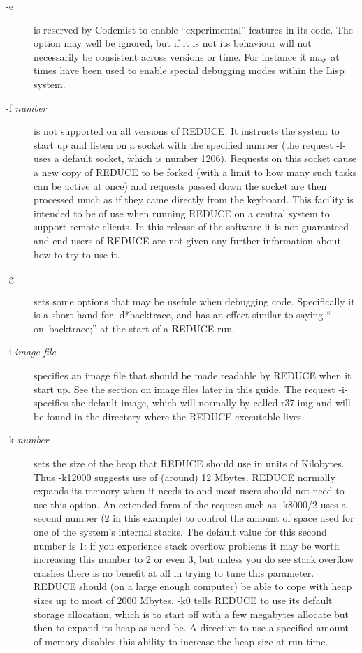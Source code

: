 \documentclass[a4paper,11pt]{article}
\begin{document}
\begin{description}
\item[{\ttfamily -e}] is reserved by Codemist to enable ``experimental''
features in its code. The option may well be ignored, but if it is not its
behaviour will not necessarily be consistent across versions or time. For
instance it may at times have been used to enable special debugging modes
within the Lisp system.

\item[{\ttfamily -f \rmfamily \slshape number}] is not supported on all
versions of REDUCE.  It instructs the system to start up and listen on
a socket with the specified number (the request {\ttfamily -f-} uses
a default socket, which is number 1206). Requests on this socket cause
a new copy of REDUCE to be forked (with a limit to how many such tasks
can be active at once) and requests passed down the socket are then processed
much as if they came directly from the keyboard. This facility is intended to
be of use when running REDUCE on a central system to support remote clients.
In this release of the software it is not guaranteed and end-users of
REDUCE are not given any further information about how to try to use it.

\item[{\ttfamily -g}] sets some options that may be usefule when
debugging code. Specifically it is a short-hand for
{\ttfamily -d*backtrace}, and has an effect similar to saying ``{\ttfamily
on~backtrace;}'' at the start of a REDUCE run.

\item[{\ttfamily -i \rmfamily \slshape image-file}] specifies an image
file that should be made readable by REDUCE when it start up. See the
section on image files later in this guide. The request {\ttfamily -i-}
specifies the default image, which will normally by called {\ttfamily r37.img}
and will be found in the directory where the REDUCE executable lives.

\item[{\ttfamily -k \rmfamily \slshape number}] sets the size of the
heap that REDUCE should use in units of Kilobytes. Thus {\ttfamily -k12000}
suggests use of (around) 12 Mbytes. REDUCE normally expands its memory
when it needs to and most users should not need to use this option.
An extended form of the request such as {\ttfamily -k8000/2} uses a
second number (2 in this example) to control the amount of space used
for one of the system's internal stacks. The default value for this second
number is 1: if you experience stack overflow problems it may be worth
increasing this number to 2 or even 3, but unless you do see stack overflow
crashes there is no benefit at all in trying to tune this parameter.
REDUCE should (on a large enough computer) be able to cope with heap sizes
up to most of 2000 Mbytes.  {\ttfamily -k0} tells REDUCE to use its default
storage allocation, which is to start off with a few megabytes allocate but
then to expand its heap as need-be. A directive to use a specified
amount of memory disables this ability to increase the heap size at run-time.


\end{description}
\end{document}
